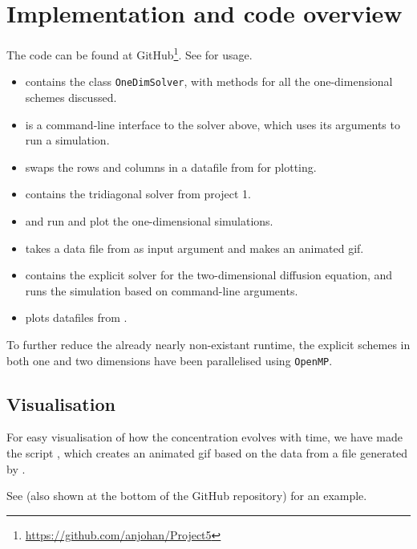 \section{Implementation and code overview}
The code can be found at GitHub\footnote{\url{https://github.com/anjohan/Project5}}. See  for usage.

\begin{itemize}
\item {} contains the class \texttt{OneDimSolver}, with methods for all the one-dimensional schemes discussed.
\item {} is a command-line interface to the solver above, which uses its arguments to run a simulation.
\item {} swaps the rows and columns in a datafile from  for plotting.
\item {} contains the tridiagonal solver from project 1.
\item {} and  run and plot the one-dimensional simulations.
\item {} takes a data file from  as input argument and makes an animated gif.
\item {} contains the explicit solver for the two-dimensional diffusion equation, and runs the simulation based on command-line arguments.
\item {} plots datafiles from .
\end{itemize}
To further reduce the already nearly non-existant runtime, the explicit schemes in both one and two dimensions have been parallelised using \texttt{OpenMP}.

\subsection{Visualisation}
For easy visualisation of how the concentration evolves with time, we have made the script , which creates an animated gif based on the data from a file generated by .

See  (also shown at the bottom of the GitHub repository) for an example.

